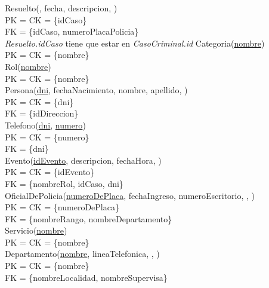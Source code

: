 \documentclass[10pt,a4paper]{article}
\begin{document}
\newline
Resuelto(, fecha, descripcion, )\\ 
	PK = CK = \{idCaso\}\\ 
	FK = \{idCaso, numeroPlacaPolicia\}\\ 	
\newline
\textit{Resuelto.idCaso} tiene que estar en \textit{CasoCriminal.id}
\newline
\newline
Categoria(\underline{nombre})\\ 
	PK = CK = \{nombre\}\\ 
\newline
Rol(\underline{nombre})\\ 
	PK = CK = \{nombre\}\\ 
\newline
Persona(\underline{dni}, fechaNacimiento, nombre, apellido, )\\ 
	PK = CK = \{dni\}\\ 
	FK = \{idDireccion\}\\ 
\newline
Telefono(\underline{\underline{dni}}, \underline{numero})\\ 
	PK = CK = \{numero\}\\
	FK = \{dni\}\\ 
\newline
Evento(\underline{idEvento}, descripcion, fechaHora, )\\ 
	PK = CK  = \{idEvento\}\\ 
	FK = \{nombreRol, idCaso, dni\}\\
\newline
OficialDePolicia(\underline{numeroDePlaca}, fechaIngreso, numeroEscritorio, , )\\
	PK = CK = \{numeroDePlaca\}\\ 
	FK = \{nombreRango, nombreDepartamento\}\\
\newline
Servicio(\underline{nombre})\\ 
	PK = CK = \{nombre\}\\ 
\newline
Departamento(\underline{nombre}, lineaTelefonica, , )\\ 
	PK = CK = \{nombre\}\\ 
	FK = \{nombreLocalidad, nombreSupervisa\}\\
\end{document}
